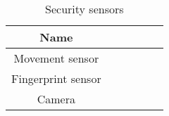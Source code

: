             \begin{table}
                \centering
                \caption{Security sensors}
                \begin{tabular}{ |c|c|c|c|c|c|}
                    \hline
                    {\textbf{Name}}  \\ 
                    \hline

                    Movement sensor  \\
                    \hline
                    Fingerprint sensor  \\
                    \hline
                    Camera \\
                    \hline
                \end{tabular}
                \label{security_sen_table}
            \end{table}
          


